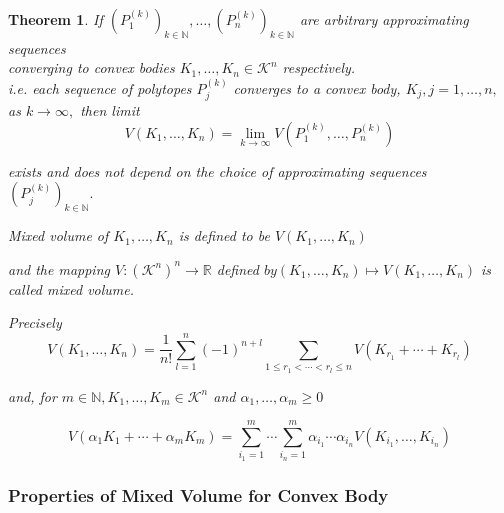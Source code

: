 \documentclass[oneside]{book}
\newtheorem{theorem}{Theorem}[section]
\begin{document}
 \begin{theorem}
  If $\left(P_{1}^{(k)}\right)_{k \in \mathbb{N}}, \ldots,\left(P_{n}^{(k)}\right)_{k \in \mathbb{N}}$ are arbitrary approximating sequences\\
  
   converging to convex bodies  $K_{1}, \ldots, K_{n} \in \mathcal{K}^{n}$ respectively.
  \\
   i.e. each sequence of polytopes $P_{j}^{(k)}$ converges to a convex body, 
   $K_{j}, j=1, \ldots, n,$ as $k \rightarrow \infty,$ 
  then limit 
  \begin{equation}
V\left(K_{1}, \ldots, K_{n}\right)=\lim _{k \rightarrow \infty} V\left(P_{1}^{(k)}, \ldots, P_{n}^{(k)}\right)
\end{equation}


exists and does not depend on the choice of approximating sequences $\left(P_{j}^{(k)}\right)_{k \in \mathbb{N}}. $ \newline

 Mixed volume of $K_{1}, \ldots, K_{n} $ is defined to be $V\left(K_{1}, \ldots, K_{n}\right)$ \newline
 
  and the mapping $V:\left(\mathcal{K}^{n}\right)^{n} \rightarrow \mathbb{R}$ defined $b y\left(K_{1}, \ldots, K_{n}\right) \mapsto V\left(K_{1}, \ldots, K_{n}\right)$ is called mixed volume.\newline
  
Precisely 
\begin{equation}
V\left(K_{1}, \ldots, K_{n}\right)=\frac{1}{n !} \sum_{l=1}^{n}(-1)^{n+l} \sum_{1 \leq r_{1}<\cdots<r_{l} \leq n} V\left(K_{r_{1}}+\cdots+K_{r_{l}}\right)
\end{equation}


and, for $m \in \mathbb{N}, K_{1}, \ldots, K_{m} \in \mathcal{K}^{n}$ and $\alpha_{1}, \ldots, \alpha_{m} \geq 0$
 
 
\begin{equation}
V\left(\alpha_{1} K_{1}+\cdots+\alpha_{m} K_{m}\right)=\sum_{i_{1}=1}^{m} \cdots \sum_{i_{n}=1}^{m} \alpha_{i_{1}} \cdots \alpha_{i_{n}} V\left(K_{i_{1}}, \ldots, K_{i_{n}}\right)
\end{equation}
 \end{theorem}
 
 \subsubsection{Properties of Mixed Volume for Convex Body}
 
\end{document}
